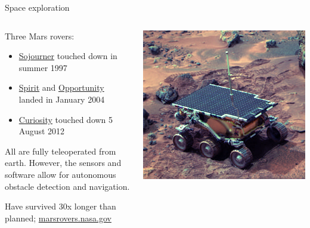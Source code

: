 \documentclass[compress]{beamer}
\begin{document}
\begin{frame}{Space exploration}

    \begin{columns}
        \begin{column}{0.6\linewidth}

        Three Mars rovers:

        \begin{itemize}

            \item
                \href{https://en.wikipedia.org/wiki/Sojourner_(rover)}{Sojourner}
                touched down in summer 1997

            \item \href{http://en.wikipedia.org/wiki/Spirit_rover}{Spirit} and
                \href{http://en.wikipedia.org/wiki/Opportunity_rover}{Opportunity}
                landed in January 2004

            \item \href{http://mars.jpl.nasa.gov/msl/mission/overview/}{Curiosity}
                touched down 5 August 2012

        \end{itemize}

        All are fully teleoperated from earth.  However, the sensors
        and software allow for autonomous obstacle detection and
        navigation.

        Have survived 30x longer than planned;
        \href{http://marsrovers.nasa.gov/}{marsrovers.nasa.gov}

        \end{column}

        \begin{column}{0.4\linewidth}
        \begin{center}
            \includegraphics[width=0.6\linewidth]{space-robot-sojourner}


\end{center}
\end{column}
\end{columns}
\end{frame}
\end{document}
